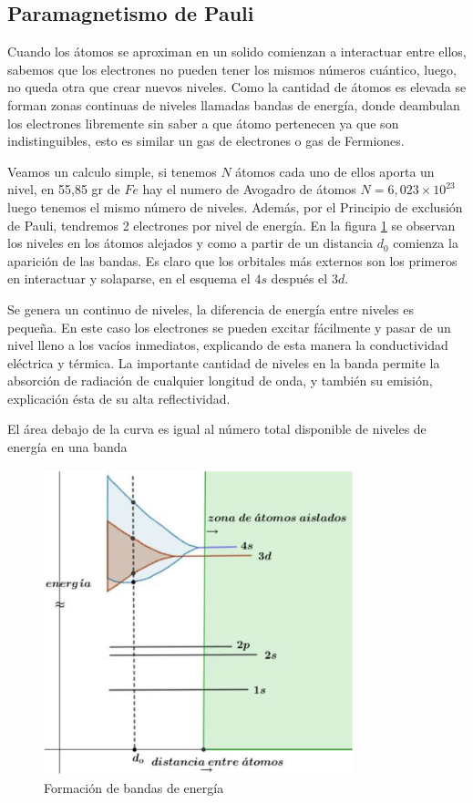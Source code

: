 \subsection{Paramagnetismo de Pauli}

Cuando los átomos se aproximan en un solido comienzan a interactuar entre ellos, sabemos que los electrones no pueden tener los mismos números cuántico, luego, no queda otra que crear nuevos niveles. Como la cantidad de átomos es elevada se forman zonas continuas de niveles llamadas bandas de energía, donde deambulan los electrones libremente sin saber a que átomo pertenecen ya que son indistinguibles, esto es similar un gas de electrones o gas de Fermiones. 

Veamos un calculo simple, si tenemos $N$ átomos cada uno de ellos aporta un nivel, en 55,85 gr de $Fe$ hay el numero de Avogadro de átomos $N=6,023\times 10^{23}$ luego tenemos el mismo número de niveles. Además, por el Principio de exclusión de Pauli, tendremos 2 electrones por nivel de energía. En la figura \ref{fig:s13} se observan los niveles en los átomos alejados y como a partir de un distancia $d_{0}$ comienza la aparición de las bandas. Es claro que los orbitales más externos son los primeros en interactuar y solaparse, en el esquema el $4s$ después el $3d$.

Se genera un continuo de niveles, la diferencia de energía entre niveles es pequeña. En este caso los electrones se pueden excitar fácilmente y pasar de un nivel lleno a los vacíos inmediatos, explicando de esta manera la conductividad eléctrica y térmica. La importante cantidad de niveles en la banda permite la absorción de radiación de cualquier longitud de onda, y también su emisión, explicación  ésta de su alta reflectividad.

El área debajo de la curva es igual al número total disponible de niveles de energía en una banda

\begin{figure}[H]
    \centering
    \includegraphics[width=0.8\textwidth]{./Figures/fig_s13}
	\caption{Formación de bandas de energía}
	\label{fig:s13}
\end{figure}

